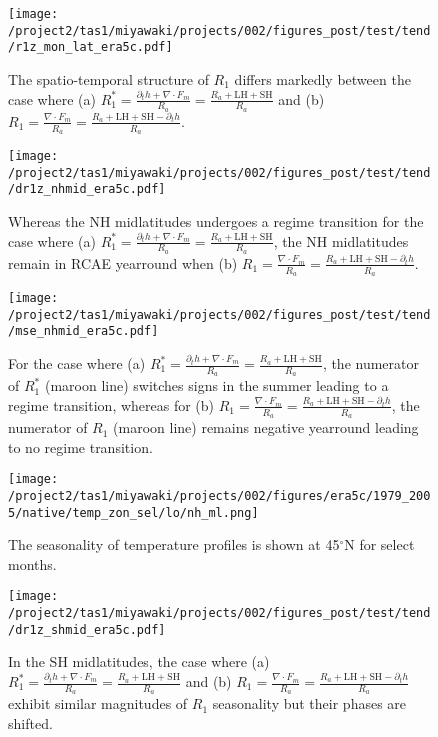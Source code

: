 \documentclass{article}
\begin{document}
\begin{figure}
    \texttt{[image: /project2/tas1/miyawaki/projects/002/figures\_post/test/tend/r1z\_mon\_lat\_era5c.pdf]}
    \caption{The spatio-temporal structure of $R_1$ differs markedly between the case where (a) $R_1^*=\frac{\partial_t h+\nabla\cdot F_m}{R_a} = \frac{R_a+\mathrm{LH+SH}}{R_a}$ and (b) $R_1=\frac{\nabla\cdot F_m}{R_a} = \frac{R_a+\mathrm{LH+SH}-\partial_t h}{R_a}$.} 
    \label{fig:r1z-mon-lat}
\end{figure}

\begin{figure}
    \texttt{[image: /project2/tas1/miyawaki/projects/002/figures\_post/test/tend/dr1z\_nhmid\_era5c.pdf]}
    \caption{Whereas the NH midlatitudes undergoes a regime transition for the case where (a) $R_1^*=\frac{\partial_t h+\nabla\cdot F_m}{R_a} = \frac{R_a+\mathrm{LH+SH}}{R_a}$, the NH midlatitudes remain in RCAE yearround when (b) $R_1=\frac{\nabla\cdot F_m}{R_a} = \frac{R_a+\mathrm{LH+SH}-\partial_t h}{R_a}$.} 
    \label{fig:dr1z-nhmid}
\end{figure}

\begin{figure}
    \texttt{[image: /project2/tas1/miyawaki/projects/002/figures\_post/test/tend/mse\_nhmid\_era5c.pdf]}
    \caption{For the case where (a) $R_1^*=\frac{\partial_t h+\nabla\cdot F_m}{R_a} = \frac{R_a+\mathrm{LH+SH}}{R_a}$, the numerator of $R_1^*$ (maroon line) switches signs in the summer leading to a regime transition, whereas for (b) $R_1=\frac{\nabla\cdot F_m}{R_a} = \frac{R_a+\mathrm{LH+SH}-\partial_t h}{R_a}$, the numerator of $R_1$ (maroon line) remains negative yearround leading to no regime transition.} 
    \label{fig:mse-nhmid}
\end{figure}

\begin{figure}
    \texttt{[image: /project2/tas1/miyawaki/projects/002/figures/era5c/1979\_2005/native/temp\_zon\_sel/lo/nh\_ml.png]}
    \caption{The seasonality of temperature profiles is shown at 45$^\circ$N for select months.}
    \label{fig:ta-nhmid}
\end{figure}

\begin{figure}
    \texttt{[image: /project2/tas1/miyawaki/projects/002/figures\_post/test/tend/dr1z\_shmid\_era5c.pdf]}
    \caption{In the SH midlatitudes, the case where (a) $R_1^*=\frac{\partial_t h+\nabla\cdot F_m}{R_a} = \frac{R_a+\mathrm{LH+SH}}{R_a}$ and (b) $R_1=\frac{\nabla\cdot F_m}{R_a} = \frac{R_a+\mathrm{LH+SH}-\partial_t h}{R_a}$ exhibit similar magnitudes of $R_1$ seasonality but their phases are shifted.} 
    \label{fig:dr1z-shmid}
\end{figure}
\end{document}
